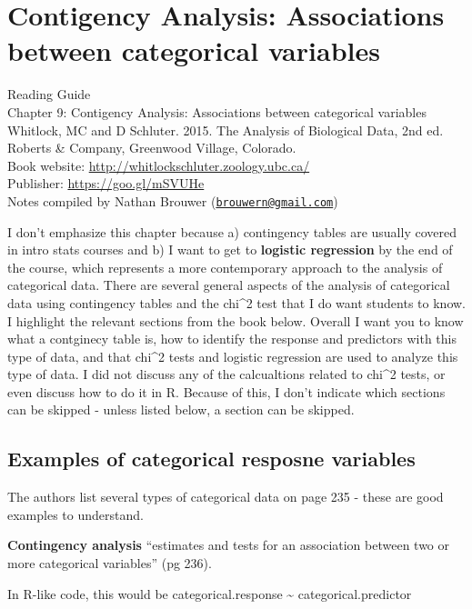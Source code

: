 \documentclass[]{book}
\theoremstyle{definition}
\theoremstyle{definition}
\theoremstyle{definition}
\theoremstyle{remark}
\begin{document}
\chapter{Contigency Analysis: Associations between categorical
variables}\label{contigency-analysis-associations-between-categorical-variables}

Reading Guide\\
Chapter 9: Contigency Analysis: Associations between categorical
variables\\
Whitlock, MC and D Schluter. 2015. The Analysis of Biological Data, 2nd
ed. Roberts \& Company, Greenwood Village, Colorado.\\
Book website: \url{http://whitlockschluter.zoology.ubc.ca/}\\
Publisher: \url{https://goo.gl/mSVUHe}\\
Notes compiled by Nathan Brouwer
(\href{mailto:brouwern@gmail.com}{\nolinkurl{brouwern@gmail.com}})

I don't emphasize this chapter because a) contingency tables are usually
covered in intro stats courses and b) I want to get to \textbf{logistic
regression} by the end of the course, which represents a more
contemporary approach to the analysis of categorical data. There are
several general aspects of the analysis of categorical data using
contingency tables and the chi\^{}2 test that I do want students to
know. I highlight the relevant sections from the book below. Overall I
want you to know what a contginecy table is, how to identify the
response and predictors with this type of data, and that chi\^{}2 tests
and logistic regression are used to analyze this type of data. I did not
discuss any of the calcualtions related to chi\^{}2 tests, or even
discuss how to do it in R. Because of this, I don't indicate which
sections can be skipped - unless listed below, a section can be skipped.

\section{Examples of categorical resposne
variables}\label{examples-of-categorical-resposne-variables}

The authors list several types of categorical data on page 235 - these
are good examples to understand.

\textbf{Contingency analysis} ``estimates and tests for an association
between two or more categorical variables'' (pg 236).

In R-like code, this would be categorical.response \textasciitilde{}
categorical.predictor
\end{document}
